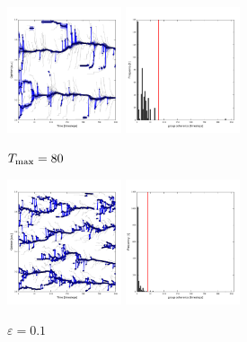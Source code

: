 \documentclass[useAMS,usenatbib]{mn2e}
\begin{document}
\begin{figure}
  \begin{center}
    \includegraphics[width=0.3\textwidth]{fig/evol_80.pdf}
    \includegraphics[width=0.3\textwidth]{fig/var_80.pdf}
  \end{center}
  \caption{\label{fig:80}$T_{\rm max}=80$}
\end{figure}

\begin{figure}
  \begin{center}
    \includegraphics[width=0.3\textwidth]{fig/evol_01.pdf}
    \includegraphics[width=0.3\textwidth]{fig/var_01.pdf}
  \end{center}
  \caption{\label{fig:01}$\varepsilon=0.1$}
\end{figure}
\end{document}
